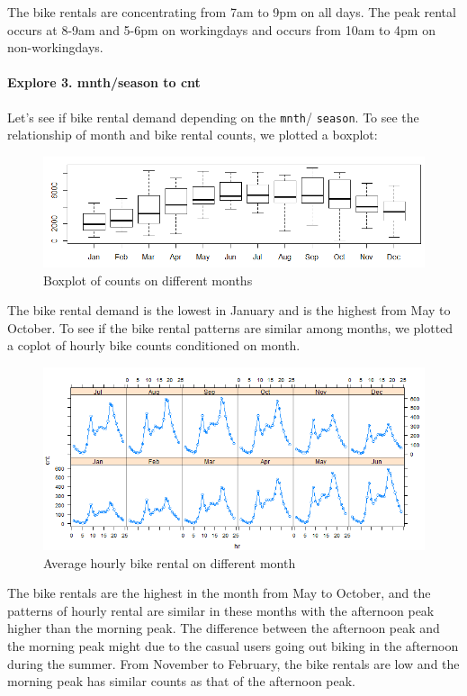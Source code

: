 \documentclass[12pt]{article}
\begin{document}
	The bike rentals are concentrating from 7am to 9pm on all days.  The peak rental occurs at 8-9am and 5-6pm on workingdays and occurs from 10am to 4pm on non-workingdays. 
	
	
	
	\paragraph*{Explore 3. mnth/season to cnt} Let’s see if bike rental demand depending on the \texttt{mnth}/ \texttt{season}. To see the relationship of month and bike rental counts, we plotted a boxplot: 
	\begin{figure}[H]
		\centering
		\includegraphics[width=\linewidth]{figures/month_count.png}
		\caption{Boxplot of counts on different months}
	\end{figure}
	The bike rental demand is the lowest in January and is the highest from May to October. To see if the bike rental patterns are similar among months, we plotted a coplot of hourly bike counts conditioned on month.
	
	\begin{figure}[H]
		\centering
		\includegraphics[width=\linewidth]{figures/cnt_hr_mnth.png}
		\caption{Average hourly bike rental on different month}
	\end{figure}
	The bike rentals are the highest in the month from May to October, and the patterns of hourly rental are similar in these months with  the afternoon peak higher than the morning peak. The difference between the afternoon peak and the morning peak might due to the casual users going out biking in the afternoon during the summer.  From November to February, the bike rentals are low and the morning peak has similar counts as that of the afternoon peak. 
	
\end{document}
